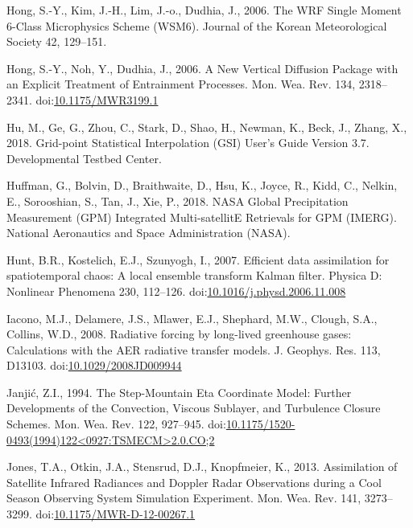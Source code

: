 \documentclass[authoryear,preprint,review,12pt]{elsarticle} %
\begin{document}
\leavevmode\hypertarget{ref-hong2006a}{}%
Hong, S.-Y., Kim, J.-H., Lim, J.-o., Dudhia, J., 2006. The WRF Single Moment 6-Class Microphysics Scheme (WSM6). Journal of the Korean Meteorological Society 42, 129--151.

\leavevmode\hypertarget{ref-hong2006}{}%
Hong, S.-Y., Noh, Y., Dudhia, J., 2006. A New Vertical Diffusion Package with an Explicit Treatment of Entrainment Processes. Mon. Wea. Rev. 134, 2318--2341. doi:\href{https://doi.org/10.1175/MWR3199.1}{10.1175/MWR3199.1}

\leavevmode\hypertarget{ref-hu2018}{}%
Hu, M., Ge, G., Zhou, C., Stark, D., Shao, H., Newman, K., Beck, J., Zhang, X., 2018. Grid-point Statistical Interpolation (GSI) User's Guide Version 3.7. Developmental Testbed Center.

\leavevmode\hypertarget{ref-huffman2018}{}%
Huffman, G., Bolvin, D., Braithwaite, D., Hsu, K., Joyce, R., Kidd, C., Nelkin, E., Sorooshian, S., Tan, J., Xie, P., 2018. NASA Global Precipitation Measurement (GPM) Integrated Multi-satellitE Retrievals for GPM (IMERG). National Aeronautics and Space Administration (NASA).

\leavevmode\hypertarget{ref-hunt2007}{}%
Hunt, B.R., Kostelich, E.J., Szunyogh, I., 2007. Efficient data assimilation for spatiotemporal chaos: A local ensemble transform Kalman filter. Physica D: Nonlinear Phenomena 230, 112--126. doi:\href{https://doi.org/10.1016/j.physd.2006.11.008}{10.1016/j.physd.2006.11.008}

\leavevmode\hypertarget{ref-iacono2008}{}%
Iacono, M.J., Delamere, J.S., Mlawer, E.J., Shephard, M.W., Clough, S.A., Collins, W.D., 2008. Radiative forcing by long-lived greenhouse gases: Calculations with the AER radiative transfer models. J. Geophys. Res. 113, D13103. doi:\href{https://doi.org/10.1029/2008JD009944}{10.1029/2008JD009944}

\leavevmode\hypertarget{ref-janjic1994}{}%
Janjić, Z.I., 1994. The Step-Mountain Eta Coordinate Model: Further Developments of the Convection, Viscous Sublayer, and Turbulence Closure Schemes. Mon. Wea. Rev. 122, 927--945. doi:\href{https://doi.org/10.1175/1520-0493(1994)122\%3C0927:TSMECM\%3E2.0.CO;2}{10.1175/1520-0493(1994)122\textless0927:TSMECM\textgreater2.0.CO;2}

\leavevmode\hypertarget{ref-jones2013}{}%
Jones, T.A., Otkin, J.A., Stensrud, D.J., Knopfmeier, K., 2013. Assimilation of Satellite Infrared Radiances and Doppler Radar Observations during a Cool Season Observing System Simulation Experiment. Mon. Wea. Rev. 141, 3273--3299. doi:\href{https://doi.org/10.1175/MWR-D-12-00267.1}{10.1175/MWR-D-12-00267.1}
\end{document}
